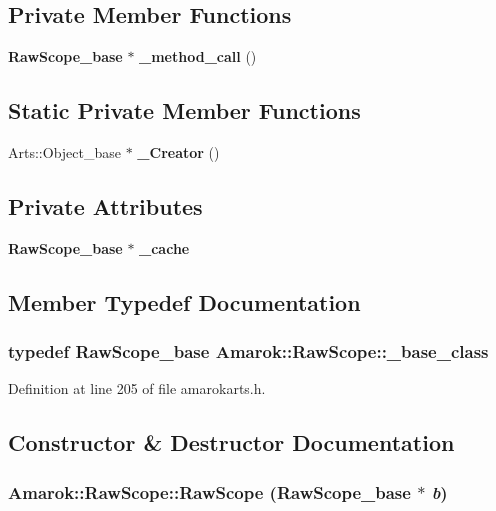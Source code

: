 \subsection*{Private Member Functions}
\begin{CompactItemize}
\item 
{\bf Raw\-Scope\_\-base} $\ast$ {\bf \_\-method\_\-call} ()
\end{CompactItemize}
\subsection*{Static Private Member Functions}
\begin{CompactItemize}
\item 
Arts::Object\_\-base $\ast$ {\bf \_\-Creator} ()
\end{CompactItemize}
\subsection*{Private Attributes}
\begin{CompactItemize}
\item 
{\bf Raw\-Scope\_\-base} $\ast$ {\bf \_\-cache}
\end{CompactItemize}


\subsection{Member Typedef Documentation}
\subsubsection{\setlength{\rightskip}{0pt plus 5cm}typedef {\bf Raw\-Scope\_\-base} {\bf Amarok::Raw\-Scope::\_\-base\_\-class}}\label{classAmarok_1_1RawScope_Amarok_1_1RawScopew0}




Definition at line 205 of file amarokarts.h.

\subsection{Constructor \& Destructor Documentation}
\subsubsection{\setlength{\rightskip}{0pt plus 5cm}Amarok::Raw\-Scope::Raw\-Scope ({\bf Raw\-Scope\_\-base} $\ast$ {\em b})\hspace{0.3cm}{\tt  [inline, protected]}}\label{classAmarok_1_1RawScope_Amarok_1_1RawScopeb0}




